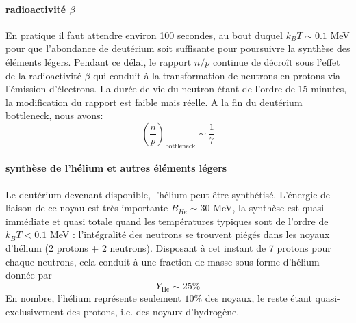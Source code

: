 \paragraph{radioactivité $\beta$} En pratique il faut attendre environ 100 secondes, au bout duquel $k_B T\sim 0.1$ MeV pour que l'abondance de deutérium soit suffisante pour poursuivre la synthèse des éléments légers. Pendant ce délai, le rapport $n/p$ continue de décroît sous l'effet de la radioactivité $\beta$ qui conduit à la transformation de neutrons en protons via l'émission d'électrons. La durée de vie du neutron étant de l'ordre de 15 minutes, la modification du rapport est faible mais réelle. A la fin du deutérium bottleneck, nous avons:
\begin{equation}
\left(\frac{n}{p}\right)_\mathrm{bottleneck} \sim \frac{1}{7}
\end{equation}

\paragraph{synthèse de l'hélium et autres éléments légers}
Le deutérium devenant disponible, l'hélium peut être synthétisé. L'énergie de liaison de ce noyau est très importante $B_{He}\sim 30$ MeV, la synthèse est quasi immédiate et quasi totale quand les températures typiques sont de l'ordre de $k_B T < 0.1$ MeV : l'intégralité des neutrons se trouvent piégés dans les noyaux d'hélium (2 protons + 2 neutrons). Disposant à cet instant de 7 protons pour chaque neutrons, cela conduit à une fraction de masse sous forme d'hélium donnée par
\begin{equation}
Y_\mathrm{He}\sim 25\%
\end{equation}
En nombre, l'hélium représente seulement $10\%$ des noyaux, le reste étant quasi-exclusivement des protons, i.e. des noyaux d'hydrogène.

